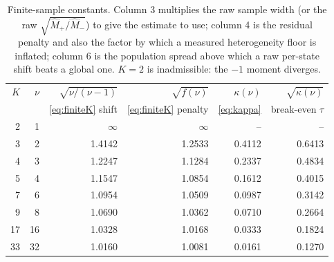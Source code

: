 \documentclass[11pt]{article}
\theoremstyle{definition}
\begin{document}
\begin{table}[t]
  \centering
  \small
  \begin{tabular}{rrrrrr}
    \toprule
    $K$ & $\nu$ & $\sqrt{\nu/(\nu-1)}$ & $\sqrt{f(\nu)}$ & $\kappa(\nu)$
        & $\sqrt{\kappa(\nu)}$ \\
    & & \eqref{eq:finiteK} shift & \eqref{eq:finiteK} penalty & \eqref{eq:kappa}
        & break-even $\tau$ \\
    \midrule
    2  & 1  & $\infty$ & $\infty$ & --      & --     \\
    3  & 2  & 1.4142   & 1.2533   & 0.4112  & 0.6413 \\
    4  & 3  & 1.2247   & 1.1284   & 0.2337  & 0.4834 \\
    5  & 4  & 1.1547   & 1.0854   & 0.1612  & 0.4015 \\
    7  & 6  & 1.0954   & 1.0509   & 0.0987  & 0.3142 \\
    9  & 8  & 1.0690   & 1.0362   & 0.0710  & 0.2664 \\
    17 & 16 & 1.0328   & 1.0168   & 0.0333  & 0.1824 \\
    33 & 32 & 1.0160   & 1.0081   & 0.0161  & 0.1270 \\
    \bottomrule
  \end{tabular}
  \caption{Finite-sample constants. Column 3 multiplies the raw sample width (or
  the raw $\sqrt{\widehat M_+/\widehat M_-}$) to give the estimate to use;
  column 4 is the residual penalty and also the factor by which a measured
  heterogeneity floor is inflated; column 6 is the population spread above which
  a raw per-state shift beats a global one. $K=2$ is inadmissible:
  the $-1$ moment diverges.}
  \label{tab:finiteK}
\end{table}
\end{document}
